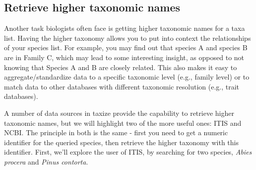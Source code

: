 \documentclass[letterpaper,superscriptaddress,showkeys,longbibliography,10pt]{revtex4-1}\usepackage{graphicx, color}
\begin{document}
\subsection{Retrieve higher taxonomic names}

Another task biologists often face is getting higher taxonomic names for a taxa list. Having the higher taxonomy allows you to put into context the relationships of your species list. For example, you may find out that species A and species B are in Family C, which may lead to some interesting insight, as opposed to not knowing that Species A and B are closely related. This also makes it easy to aggregate/standardize data to a specific taxonomic level (e.g., family level) or to match data to other databases with different taxonomic resolution (e.g., trait databases).

A number of data sources in taxize provide the capability to retrieve higher taxonomic names, but we will highlight two of the more useful ones: ITIS and NCBI. The principle in both is the same - first you need to get a numeric identifier for the queried species, then retrieve the higher taxonomy with this identifier. First, we'll explore the user of ITIS, by searching for two species, \emph{Abies procera} and \emph{Pinus contorta}.
\end{document}
